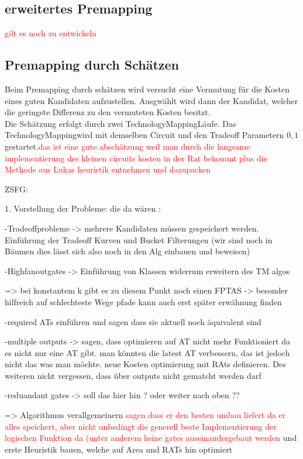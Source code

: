\documentclass[11pt, a4paper, german]{article}
\newcommand{\TM}{TechnologyMapping}
\begin{document}
 
\subsection{erweitertes Premapping}
\label{subsec:erweitertes_premapping}
\textcolor{red}{gilt es noch zu entwickeln} 
 
 
\subsection{Premapping durch Schätzen}
\label{subsec:neinhierfrnochkeinlabel}
 Beim Premapping durch schätzen wird versucht eine Vermutung für die Kosten eines guten Kandidaten aufzustellen. Ausgwählt wird dann der Kandidat, welcher die geringste Differenz zu den vermuteten Kosten besitzt.\\
 Die Schätzung erfolgt durch zwei \TM Läufe. Das \TM wird mit demselben Circuit  und den Tradeoff Parametern $0,1$ gestartet.\textcolor{red}{das ist eine gute abschätzung weil man durch die langsame implementierung des kleinen circuits kosten in der Rat bekommt plus die Methode aus Lukas heuristik entnehmen und dazupacken}

\newpage

ZSFG:

1. Vorstellung der Probleme: die da wären :

	-Tradeoffprobleme -> mehrere Kandidaten müssen gespeichert werden. Einführung der Tradeoff Kurven und Bucket Filterungen (wir sind noch in Bäumen dies lässt sich also noch in den Alg einbauen und beweisen) 
	
	-Highfanoutgates -> Einführung von Klassen widerrum erweitern des TM algos 
	
	=> bei konstantem k gibt es zu diesem Punkt noch einen FPTAS -> besonder hilfreich auf schlechteste Wege pfade kann auch erst später erwähnung finden
	
	-required ATs einführen und sagen dass sie aktuell noch äquivalent sind 
	
	-multiple outputs -> sagen, dass optimieren auf AT nicht mehr Funktioniert da es nicht nur eine AT gibt. man könnten die latest AT verbessern, das ist jedoch nicht das was man möchte. neue Kosten optimierung mit RAts definieren. Des weiteren nicht vergessen, dass über outputs nicht gematcht werden darf 
	
	-reduandant gates -> soll das hier hin ? oder weiter nach oben ??
	
	=> Algorithmus verallgemeinern \textcolor{red}{sagen dass er den besten umbau liefert da er alles speichert, aber nicht unbedingt die generell beste Implementierung der logischen Funktion da (unter anderem keine gates auseinandergebaut werden} und erste Heuristik bauen, welche auf Area  und RATs hin optimiert
\end{document}
